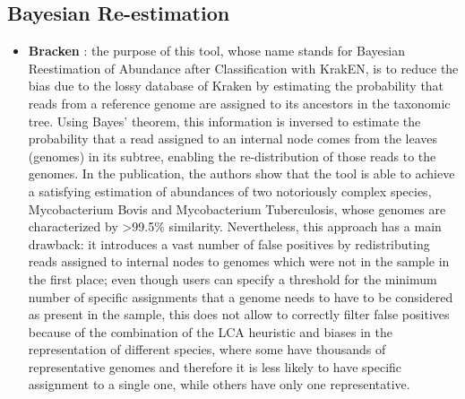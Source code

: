 \subsection{Bayesian Re-estimation}
\begin{itemize}
    \item \textbf{Bracken} \cite{lu_bracken:_2017}: the purpose of this tool, whose name stands for Bayesian Reestimation of Abundance after Classification with KrakEN, is to reduce the bias due to the lossy database of Kraken by estimating the probability that reads from a reference genome are assigned to its ancestors in the taxonomic tree. Using Bayes' theorem, this information is inversed to estimate the probability that a read assigned to an internal node comes from the leaves (genomes) in its subtree, enabling the re-distribution of those reads to the genomes. In the publication, the authors show that the tool is able to achieve a satisfying estimation of abundances of two notoriously complex species, Mycobacterium Bovis and Mycobacterium Tuberculosis, whose genomes are characterized by >99.5\% similarity. Nevertheless, this approach has a main drawback: it introduces a vast number of false positives by redistributing reads assigned to internal nodes to genomes which were not in the sample in the first place; even though users can specify a threshold for the minimum number of specific assignments that a genome needs to have to be considered as present in the sample, this does not allow to correctly filter false positives because of the combination of the LCA heuristic and biases in the representation of different species, where some have thousands of representative genomes and therefore it is less likely to have specific assignment to a single one, while others have only one representative.
\end{itemize}

